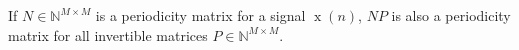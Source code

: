 If $N \in \mathbb{N}^{M \times M}$ is a periodicity matrix for a signal $\operatorname{x}(n)$, $N P$ is also a periodicity matrix for all invertible matrices $P \in \mathbb{N}^{M \times M}$.
